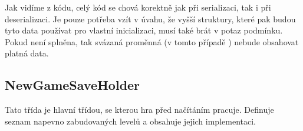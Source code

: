 Jak vidíme z kódu, celý kód se chová korektně jak při serializaci, tak i při deserializaci. Je pouze potřeba vzít v úvahu, že vyšší struktury, které pak budou tyto data používat pro vlastní inicializaci, musí také brát v potaz podmínku. Pokud není splněna, tak svázaná proměnná (v tomto případě ) nebude obsahovat platná data.

\subsection{NewGameSaveHolder}

 Tato třída je hlavní třídou, se kterou hra před načítáním pracuje. Definuje seznam napevno zabudovaných levelů a obsahuje jejich implementaci.









